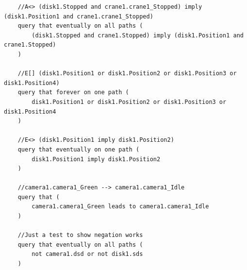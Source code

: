\begin{verbatim}
	//A<> (disk1.Stopped and crane1.crane1_Stopped) imply (disk1.Position1 and crane1.crane1_Stopped)
	query that eventually on all paths (
		(disk1.Stopped and crane1.Stopped) imply (disk1.Position1 and crane1.Stopped)
	)
	
	//E[] (disk1.Position1 or disk1.Position2 or disk1.Position3 or disk1.Position4)
	query that forever on one path (
		disk1.Position1 or disk1.Position2 or disk1.Position3 or disk1.Position4
	)
	
	//E<> (disk1.Position1 imply disk1.Position2)
	query that eventually on one path (
		disk1.Position1 imply disk1.Position2
	)
	
	//camera1.camera1_Green --> camera1.camera1_Idle
	query that (
		camera1.camera1_Green leads to camera1.camera1_Idle
	)
	
	//Just a test to show negation works
	query that eventually on all paths (
		not camera1.dsd or not disk1.sds
	)
\end{verbatim}

